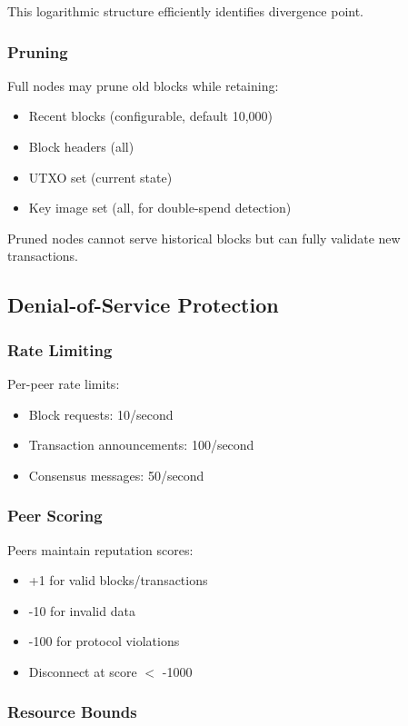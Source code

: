 This logarithmic structure efficiently identifies divergence point.

\subsubsection{Pruning}

Full nodes may prune old blocks while retaining:
\begin{itemize}
  \item Recent blocks (configurable, default 10,000)
  \item Block headers (all)
  \item UTXO set (current state)
  \item Key image set (all, for double-spend detection)
\end{itemize}

Pruned nodes cannot serve historical blocks but can fully validate new
transactions.

\subsection{Denial-of-Service Protection}

\subsubsection{Rate Limiting}

Per-peer rate limits:
\begin{itemize}
  \item Block requests: 10/second
  \item Transaction announcements: 100/second
  \item Consensus messages: 50/second
\end{itemize}

\subsubsection{Peer Scoring}

Peers maintain reputation scores:
\begin{itemize}
  \item +1 for valid blocks/transactions
  \item -10 for invalid data
  \item -100 for protocol violations
  \item Disconnect at score $<$ -1000
\end{itemize}

\subsubsection{Resource Bounds}

